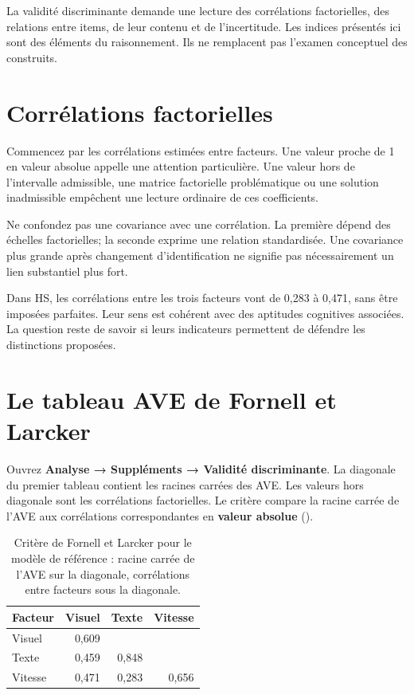\documentclass[
  french,
  11pt,
  a4paper,
  DIV=11,
  numbers=noendperiod]{scrreprt}
\begin{document}
La validité discriminante demande une lecture des corrélations
factorielles, des relations entre items, de leur contenu et de
l'incertitude. Les indices présentés ici sont des éléments du
raisonnement. Ils ne remplacent pas l'examen conceptuel des construits.

\section{Corrélations factorielles}\label{corruxe9lations-factorielles}

Commencez par les corrélations estimées entre facteurs. Une valeur
proche de 1 en valeur absolue appelle une attention particulière. Une
valeur hors de l'intervalle admissible, une matrice factorielle
problématique ou une solution inadmissible empêchent une lecture
ordinaire de ces coefficients.

Ne confondez pas une covariance avec une corrélation. La première dépend
des échelles factorielles; la seconde exprime une relation standardisée.
Une covariance plus grande après changement d'identification ne signifie
pas nécessairement un lien substantiel plus fort.

Dans HS, les corrélations entre les trois facteurs vont de 0,283 à
0,471, sans être imposées parfaites. Leur sens est cohérent avec des
aptitudes cognitives associées. La question reste de savoir si leurs
indicateurs permettent de défendre les distinctions proposées.

\section{Le tableau AVE de Fornell et
Larcker}\label{le-tableau-ave-de-fornell-et-larcker}

Ouvrez \textbf{Analyse → Suppléments → Validité discriminante}. La
diagonale du premier tableau contient les racines carrées des AVE. Les
valeurs hors diagonale sont les corrélations factorielles. Le critère
compare la racine carrée de l'AVE aux corrélations correspondantes en
\textbf{valeur absolue} ().


{

\begin{longtable}[]{@{}lrrr@{}}

\caption{\label{tbl-fl}Critère de Fornell et Larcker pour le modèle de
référence : racine carrée de l'AVE sur la diagonale, corrélations entre
facteurs sous la diagonale.}

\tabularnewline

\toprule\noalign{}
Facteur & Visuel & Texte & Vitesse \\
\midrule\noalign{}
\endhead
\bottomrule\noalign{}
\endlastfoot
Visuel & 0,609 & & \\
Texte & 0,459 & 0,848 & \\
Vitesse & 0,471 & 0,283 & 0,656 \\

\end{longtable}

}
\end{document}
